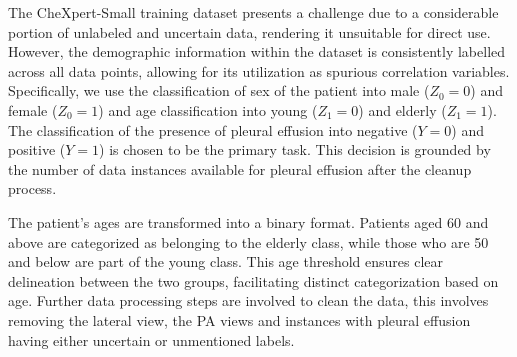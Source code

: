 \documentclass[12pt,DIV14,BCOR12mm,a4paper,footinclude=false,headinclude,parskip=half-,twoside,openright,cleardoublepage=empty,toc=index,bibliography=totoc,listof=totoc]{scrreprt}
\numberwithin{equation}{chapter}
\begin{document}

The CheXpert-Small training dataset presents a challenge due to a considerable portion of unlabeled and uncertain data, rendering it unsuitable for direct use. However, the demographic information within the dataset is consistently labelled across all data points, allowing for its utilization as spurious correlation variables. Specifically, we use 
the classification of sex of the patient into male ($Z_0=0$) and female ($Z_0=1$) and age classification into young ($Z_1=0$) and elderly ($Z_1=1$). The classification of the presence of pleural effusion into negative ($Y=0$) and positive ($Y=1$) is chosen to be the primary task. This decision is grounded by the number of data instances available for pleural effusion after the cleanup process.

The patient's ages are transformed into a binary format. Patients aged 60 and above are categorized as belonging to the elderly class, while those who are 50 and below are part of the young class. This age threshold ensures clear delineation between the two groups, facilitating distinct categorization based on age. Further data processing steps are involved to clean the data, this involves removing the lateral view, the PA views and instances with pleural effusion having either uncertain or unmentioned labels. 
\end{document}
